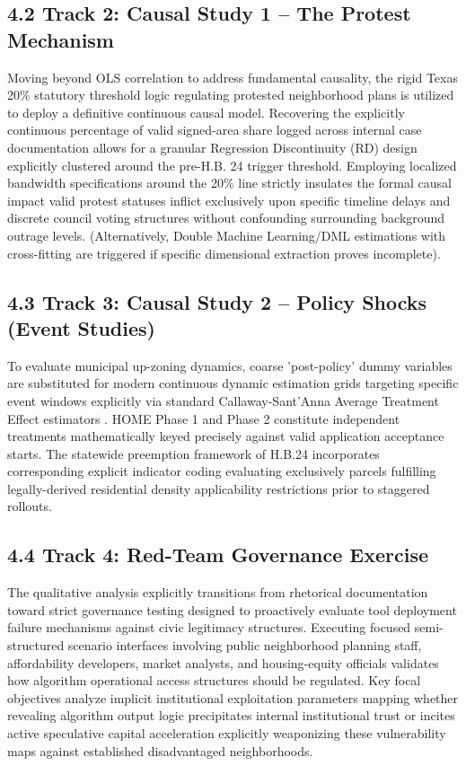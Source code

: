 \subsection*{4.2 Track 2: Causal Study 1 -- The Protest Mechanism}
Moving beyond OLS correlation to address fundamental causality, the rigid Texas 20\% statutory threshold logic regulating protested neighborhood plans is utilized to deploy a definitive continuous causal model. Recovering the explicitly continuous percentage of valid signed-area share logged across internal case documentation allows for a granular Regression Discontinuity (RD) design explicitly clustered around the pre-H.B. 24 trigger threshold. Employing localized bandwidth specifications around the 20\% line strictly insulates the formal causal impact valid protest statuses inflict exclusively upon specific timeline delays and discrete council voting structures without confounding surrounding background outrage levels. (Alternatively, Double Machine Learning/DML estimations with cross-fitting are triggered if specific dimensional extraction proves incomplete).

\subsection*{4.3 Track 3: Causal Study 2 -- Policy Shocks (Event Studies)}
To evaluate municipal up-zoning dynamics, coarse 'post-policy' dummy variables are substituted for modern continuous dynamic estimation grids targeting specific event windows explicitly via standard Callaway-Sant'Anna Average Treatment Effect estimators \cite{callaway2021difference}. HOME Phase 1 and Phase 2 constitute independent treatments mathematically keyed precisely against valid application acceptance starts. The statewide preemption framework of H.B.24 incorporates corresponding explicit indicator coding evaluating exclusively parcels fulfilling legally-derived residential density applicability restrictions prior to staggered rollouts.

\subsection*{4.4 Track 4: Red-Team Governance Exercise}
The qualitative analysis explicitly transitions from rhetorical documentation toward strict governance testing designed to proactively evaluate tool deployment failure mechanisms against civic legitimacy structures. Executing focused semi-structured scenario interfaces involving public neighborhood planning staff, affordability developers, market analysts, and housing-equity officials validates how algorithm operational access structures should be regulated. Key focal objectives analyze implicit institutional exploitation parameters mapping whether revealing algorithm output logic precipitates internal institutional trust or incites active speculative capital acceleration explicitly weaponizing these vulnerability maps against established disadvantaged neighborhoods.

